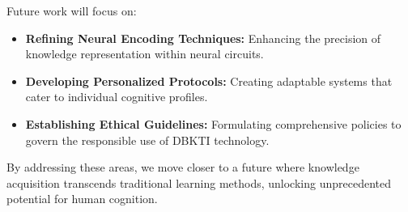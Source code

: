 \documentclass[12pt]{article}
\begin{document}
Future work will focus on:
\begin{itemize}
  \item \textbf{Refining Neural Encoding Techniques:} Enhancing the precision of knowledge representation within neural circuits.
  \item \textbf{Developing Personalized Protocols:} Creating adaptable systems that cater to individual cognitive profiles.
  \item \textbf{Establishing Ethical Guidelines:} Formulating comprehensive policies to govern the responsible use of DBKTI technology.
\end{itemize}

By addressing these areas, we move closer to a future where knowledge acquisition transcends traditional learning methods, unlocking unprecedented potential for human cognition.

\printbibliography
\end{document}
